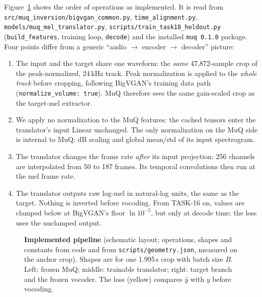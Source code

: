\documentclass[10pt,letterpaper]{article}
\newcommand{\src}[1]{\nolinkurl{#1}}
\begin{document}
Figure~\ref{fig:pipeline} shows the order of operations as implemented. It is read from \src{src/muq_inversion/bigvgan_common.py}, \src{time_alignment.py}, \src{models/muq_mel_translator.py}, \src{scripts/train_task18_heldout.py} (\texttt{build\_features}, training loop, \texttt{decode}) and the installed \texttt{muq 0.1.0} package. Four points differ from a generic ``audio $\to$ encoder $\to$ decoder'' picture:
\begin{enumerate}
\item The input and the target share one waveform: the \emph{same} 47{,}872-sample crop of the peak-normalized, 24\,kHz track. Peak normalization is applied to the \emph{whole track} before cropping, following BigVGAN's training data path (\texttt{normalize\_volume: true}). MuQ therefore sees the same gain-scaled crop as the target-mel extractor.
\item We apply no normalization to the MuQ features: the cached tensors enter the translator's input Linear unchanged. The only normalization on the MuQ side is internal to MuQ: dB scaling and global mean/std of its input spectrogram.
\item The translator changes the frame rate \emph{after} its input projection: 256 channels are interpolated from 50 to 187 frames. Its temporal convolutions then run at the mel frame rate.
\item The translator outputs raw log-mel in natural-log units, the same as the target. Nothing is inverted before vocoding. From TASK-16 on, values are clamped below at BigVGAN's floor $\ln 10^{-5}$, but only at decode time; the loss uses the unclamped output.
\end{enumerate}

\begin{figure}[t]
\centering
\resizebox{\textwidth}{!}{}
\caption{\textbf{Implemented pipeline} (schematic layout; operations, shapes and constants from code and from \src{scripts/geometry.json}, measured on the anchor crop). Shapes are for one 1.995\,s crop with batch size $B$. Left: frozen MuQ; middle: trainable translator; right: target branch and the frozen vocoder. The loss (yellow) compares $\hat y$ with $y$ before vocoding.}
\label{fig:pipeline}
\end{figure}
\end{document}
